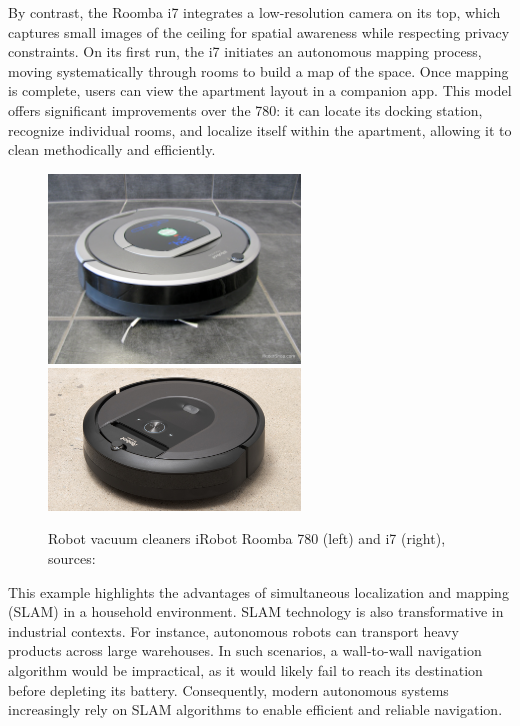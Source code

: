 By contrast, the Roomba i7 integrates a low-resolution camera on its top, which captures small images of the ceiling for spatial awareness while respecting privacy constraints. On its first run, the i7 initiates an autonomous mapping process, moving systematically through rooms to build a map of the space. Once mapping is complete, users can view the apartment layout in a companion app. This model offers significant improvements over the 780: it can locate its docking station, recognize individual rooms, and localize itself within the apartment, allowing it to clean methodically and efficiently.
\FloatBarrier
\begin{figure}[htbp]
	\centering
	\includegraphics[width=67mm, keepaspectratio]{figures/iRobot_roomba_780.jpg}\hspace{1cm}
	\includegraphics[width=67mm, keepaspectratio]{figures/iRobot_roomba_i7.jpg}\\\vspace{5mm}
	\caption{Robot vacuum cleaners iRobot Roomba 780 (left) and i7 (right), sources: \cite{roomba780}\cite{roombai7}}
	\label{fig:Roombas}
\end{figure}
\FloatBarrier
This example highlights the advantages of simultaneous localization and mapping (SLAM) in a household environment. SLAM technology is also transformative in industrial contexts. For instance, autonomous robots can transport heavy products across large warehouses. In such scenarios, a wall-to-wall navigation algorithm would be impractical, as it would likely fail to reach its destination before depleting its battery. Consequently, modern autonomous systems increasingly rely on SLAM algorithms to enable efficient and reliable navigation.

